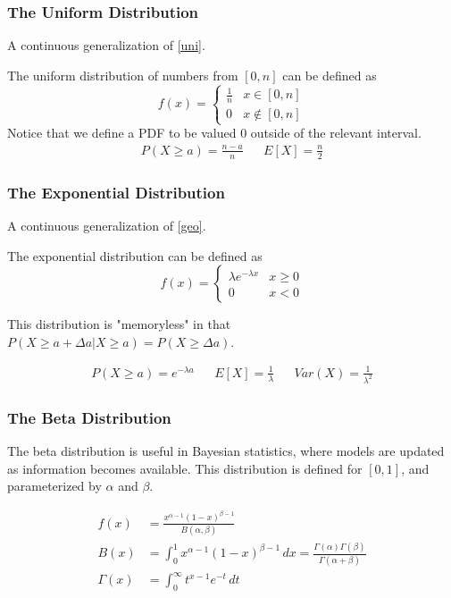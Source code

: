 \documentclass{article}
\begin{document}
\subsubsection{The Uniform Distribution}
A continuous generalization of \ref{uni}.

The uniform distribution of numbers from $[0, n]$ can be defined as
\[
    f(x) =
    \begin{cases}
        \frac{1}{n} & x \in [0,n] \\
        0 & x \notin [0,n]
    \end{cases}
\]
Notice that we define a PDF to be valued $0$ outside of the relevant interval.
\begin{align*}
    P(X\ge a)=\frac{n-a}{n} &&
    E[X] = \frac{n}{2}
\end{align*}

\subsubsection{The Exponential Distribution}
A continuous generalization of \ref{geo}.

The exponential distribution can be defined as
\[
    f(x) =
    \begin{cases}
        \lambda e^{-\lambda x} & x \ge 0 \\
        0 & x < 0
    \end{cases}
\]

This distribution is "memoryless" in that $P(X \ge a + \Delta a | X \ge a) = P(X \ge \Delta a)$.

\begin{align*}
   P(X\ge a) = e^{-\lambda a}&& E[X] = \frac{1}{\lambda} && Var(X) = \frac{1}{\lambda^2}
\end{align*}

\subsubsection{The Beta Distribution}
The beta distribution is useful in Bayesian statistics, where models are updated as information becomes available. This distribution is defined for $[0,1]$, and parameterized by $\alpha$ and $\beta$.

\begin{align*}
    f(x) &= \frac{x^{\alpha - 1}\left(1-x\right)^{\beta - 1}}{B(\alpha, \beta)}\\
    B(x) &= \int_0^1x^{\alpha-1}\left(1-x\right)^{\beta - 1}\,dx=\frac{\Gamma(\alpha)\Gamma(\beta)}{\Gamma(\alpha+\beta)}\\
    \Gamma(x) &= \int_0^\infty t^{x-1}e^{-t}\,dt
\end{align*}
\end{document}
